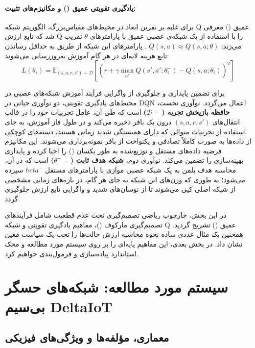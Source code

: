 \documentclass[oneside,openany,phd]{TMU-Thesis}
\begin{document}
\paragraph{یادگیری تقویتی عمیق () و مکانیزم‌های تثبیت:}

برای غلبه بر نفرین ابعاد در محیط‌های مقیاس‌بزرگ، الگوریتم شبکه Q عمیق () معرفی شد که تابع ارزش Q را با استفاده از یک شبکه‌ی عصبی عمیق با پارامترهای $\theta$ تقریب می‌زند: $Q(s, a) \approx Q(s, a; \theta)$ \cite{mnih2015human}. پارامترهای این شبکه از طریق به حداقل رساندن تابع هزینه لایه‌ای در هر گام آموزش به‌روزرسانی می‌شوند:
$$L(\theta_i) = \mathbb{E}_{(s, a, r, s') \sim \mathcal{D}} \left[ \left( r + \gamma \max_{a'} Q(s', a'; \theta_i^-) - Q(s, a; \theta_i) \right)^2 \right]$$

برای تضمین پایداری و جلوگیری از واگرایی فرآیند آموزش شبکه‌های عصبی در محیط‌های یادگیری تقویتی، دو نوآوری حیاتی در DQN اعمال می‌گردد. نوآوری نخست، \textbf{حافظه بازپخش تجربه ( -- $\mathcal{D}$)} است که طی آن، عامل تجربیات خود را در قالب انتقال‌های $(s, a, r, s')$ درون یک بافر ذخیره می‌کند و در طول فاز آموزش، به جای استفاده از تجربیات متوالی که دارای همبستگی شدید زمانی هستند، دسته‌های کوچکی از داده‌ها به صورت کاملاً تصادفی و یکنواخت از بافر نمونه‌برداری می‌شوند. این مکانیزم فرضیه داده‌های مستقل و توزیع‌شده به طور یکسان () را احیا کرده و پایداری بهینه‌سازی را تضمین می‌کند. نوآوری دوم، \textbf{شبکه هدف ثابت ( -- $\theta^-$)} است که در آن، محاسبه هدف بلمن به یک شبکه عصبی موازی با پارامترهای مستقل $	heta^-$ سپرده می‌شود؛ به طوری که وزن‌های این شبکه به جای هر گام، در بازه‌های زمانی مشخصی از شبکه اصلی کپی می‌شوند تا از نوسان‌های شدید و واگرایی تابع ارزش جلوگیری گردد.

در این بخش، چارچوب ریاضی تصمیم‌گیری تحت عدم قطعیت شامل فرآیندهای تصمیم‌گیری مارکوف ()، مفاهیم یادگیری تقویتی و شبکه Q عمیق () تشریح گردید. همچنین یک مثال عددی ساده نحوه محاسبه ارزش حالت‌ها را تحت یک سیاست معین نشان داد. در بخش بعدی، این مفاهیم پایه‌ای را بر روی سیستم مورد مطالعه و محک استاندارد  پیاده‌سازی و فرمول‌بندی خواهیم کرد.

\section{سیستم مورد مطالعه: شبکه‌های حسگر بی‌سیم DeltaIoT}

\subsection{معماری، مؤلفه‌ها و ویژگی‌های فیزیکی}
\end{document}
